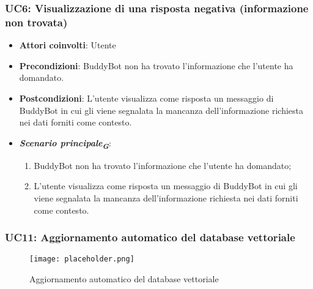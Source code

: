 \hypertarget{UC6}{}
\subsubsection{UC6: Visualizzazione di una risposta negativa (informazione non trovata)}

\begin{itemize}
    \item \textbf{Attori coinvolti}: Utente
    \item \textbf{Precondizioni}: BuddyBot non ha trovato l'informazione che l'utente ha domandato.
    \item \textbf{Postcondizioni}: L'utente visualizza come risposta un messaggio di BuddyBot in cui gli viene segnalata la mancanza dell'informazione 
    richiesta nei dati forniti come contesto.
    \item \textbf{\emph{Scenario principale}\textsubscript{\textbf{\textit{G}}}}:
    \begin{enumerate}
        \item BuddyBot non ha trovato l'informazione che l'utente ha domandato;
        \item L'utente visualizza come risposta un messaggio di BuddyBot in cui gli viene segnalata la mancanza dell'informazione richiesta 
        nei dati forniti come contesto.
    \end{enumerate}
\end{itemize}







\hypertarget{UC11}{}
\subsubsection{UC11: Aggiornamento automatico del database vettoriale}

\begin{figure}[h]
    \centering
    \texttt{[image: placeholder.png]}
    \caption{Aggiornamento automatico del database vettoriale}
\end{figure}

